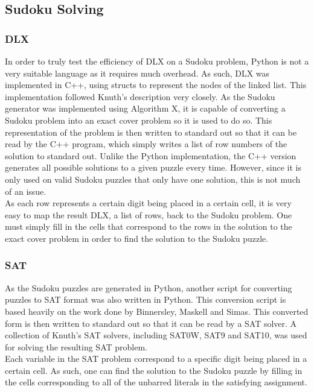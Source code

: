 \documentclass[12pt]{article}
\newcounter{row}
\newcounter{col}
\begin{document}
\subsection{Sudoku Solving}
\subsubsection{DLX}
In order to truly test the efficiency of DLX on a Sudoku problem, Python is not a very suitable language as it requires much overhead. As such, DLX was implemented in C++, using structs to represent the nodes of the linked list. This implementation followed Knuth's description very closely. As the Sudoku generator was implemented using Algorithm X, it is capable of converting a Sudoku problem into an exact cover problem so it is used to do so. This representation of the problem is then written to standard out so that it can be read by the C++ program, which simply writes a list of row numbers of the solution to standard out. Unlike the Python implementation, the C++ version generates all possible solutions to a given puzzle every time. However, since it is only used on valid Sudoku puzzles that only have one solution, this is not much of an issue. \\

As each row represents a certain digit being placed in a certain cell, it is very easy to map the result DLX, a list of rows, back to the Sudoku problem. One must simply fill in the cells that correspond to the rows in the solution to the exact cover problem in order to find the solution to the Sudoku puzzle.

\subsubsection{SAT}
As the Sudoku puzzles are generated in Python, another script for converting puzzles to SAT format was also written in Python. This conversion script is based heavily on the work done by Binnersley, Maskell and Simas. This converted form is then written to standard out so that it can be read by a SAT solver. A collection of Knuth's SAT solvers, including SAT0W, SAT9 and SAT10, was used for solving the resulting SAT problem. \\

Each variable in the SAT problem correspond to a specific digit being placed in a certain cell. As such, one can find the solution to the Sudoku puzzle by filling in the cells corresponding to all of the unbarred literals in the satisfying assignment.
\end{document}
